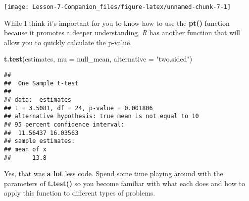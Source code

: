 \documentclass[
]{article}
\newenvironment{Shaded}{\begin{snugshade}}{\end{snugshade}}
\newcommand{\DataTypeTok}[1]{\textcolor[rgb]{0.13,0.29,0.53}{#1}}
\newcommand{\KeywordTok}[1]{\textcolor[rgb]{0.13,0.29,0.53}{\textbf{#1}}}
\newcommand{\NormalTok}[1]{#1}
\newcommand{\StringTok}[1]{\textcolor[rgb]{0.31,0.60,0.02}{#1}}
\begin{document}
\begin{center}\texttt{[image: Lesson-7-Companion\_files/figure-latex/unnamed-chunk-7-1]} \end{center}

While I think it's important for you to know how to use the
\textbf{pt()} function because it promotes a deeper understanding,
\emph{R} has another function that will allow you to quickly calculate
the p-value.

\begin{Shaded}
\begin{Highlighting}[]
\KeywordTok{t.test}\NormalTok{(estimates, }\DataTypeTok{mu =}\NormalTok{ null_mean, }\DataTypeTok{alternative =} \StringTok{"two.sided"}\NormalTok{)}
\end{Highlighting}
\end{Shaded}

\begin{verbatim}
## 
##  One Sample t-test
## 
## data:  estimates
## t = 3.5081, df = 24, p-value = 0.001806
## alternative hypothesis: true mean is not equal to 10
## 95 percent confidence interval:
##  11.56437 16.03563
## sample estimates:
## mean of x 
##      13.8
\end{verbatim}

Yes, that was \textbf{a lot} less code. Spend some time playing around
with the parameters of \textbf{t.test()} so you become familiar with
what each does and how to apply this function to different types of
problems.
\end{document}
